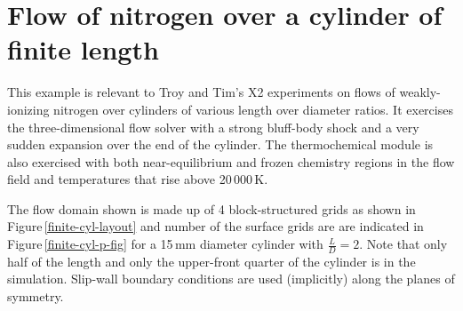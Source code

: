 
\section{Flow of nitrogen over a cylinder of finite length}
\label{finite-cyl-sec}
%
This example is relevant to Troy and Tim's X2 experiments on flows of weakly-ionizing
nitrogen over cylinders of various length over diameter ratios.
It exercises the three-dimensional flow solver with a strong bluff-body shock and
a very sudden expansion over the end of the cylinder.
The thermochemical module is also exercised with both near-equilibrium and frozen chemistry
regions in the flow field and temperatures that rise above 20\,000\,K.

\medskip
The flow domain shown is made up of 4 block-structured grids as shown in Figure\,\ref{finite-cyl-layout}
and number of the surface grids are are indicated in Figure\,\ref{finite-cyl-p-fig} for a 15\,mm diameter cylinder 
with $\frac{L}{D} = 2$.
Note that only half of the length and only the upper-front quarter 
of the cylinder is in the simulation.
Slip-wall boundary conditions are used (implicitly) along the planes of symmetry.

